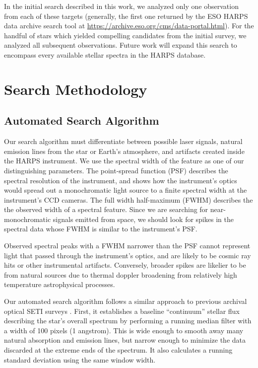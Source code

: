 \documentclass[linenumbers]{aastex631}
\begin{document}
In the initial search described in this work, we analyzed only one observation from each of these targets (generally, the first one returned by the ESO HARPS data archive search tool at \url{https://archive.eso.org/cms/data-portal.html}). For the handful of stars which yielded compelling candidates from the initial survey, we analyzed all subsequent observations. Future work will expand this search to encompass every available stellar spectra in the HARPS database.

\section{Search Methodology}
\subsection{Automated Search Algorithm}
\label{s:automated}

Our search algorithm must differentiate between possible laser signals, natural emission lines from the star or Earth's atmosphere, and artifacts created inside the HARPS instrument.  We use the spectral width of the feature as one of our distinguishing parameters. The point-spread function (PSF) describes the spectral resolution of the instrument, and shows how the instrument's optics would spread out a monochromatic light source to a finite spectral width at the instrument's CCD cameras. The full width half-maximum (FWHM) describes the the observed width of a spectral feature.  Since we are searching for near-monochromatic signals emitted from space, we should look for spikes in the spectral data whose FWHM is similar to the instrument's PSF.

Observed spectral peaks with a FWHM narrower than the PSF cannot represent light that passed through the instrument's optics, and are likely to be cosmic ray hits or other instrumental artifacts. Conversely, broader spikes are likelier to be from natural sources due to thermal doppler broadening from relatively high temperature astrophysical processes.

Our automated search algorithm follows a similar approach to previous archival optical SETI surveys \citep{Tellis_2017,Lipman_2019,Marcy_2021}. First, it establishes a baseline ``continuum'' stellar flux describing the star's overall spectrum by performing a running median filter with a width of 100 pixels (1 angstrom).  This is wide enough to smooth away many natural absorption and emission lines, but narrow enough to minimize the data discarded at the extreme ends of the spectrum.  It also calculates a running standard deviation using the same window width.
\end{document}
